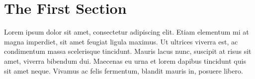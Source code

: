 \documentclass[onecolumn, draftclsnofoot,10pt, compsoc]{IEEEtran}
\begin{document}
\section{The First Section}
Lorem ipsum dolor sit amet, consectetur adipiscing elit.
Etiam elementum mi at magna imperdiet, sit amet feugiat ligula maximus.
Ut ultrices viverra est, ac condimentum massa scelerisque tincidunt.
Mauris lacus nunc, suscipit at risus sit amet, viverra bibendum dui.
Maecenas eu urna et lorem dapibus tincidunt quis sit amet neque.
Vivamus ac felis fermentum, blandit mauris in, posuere libero.

\nocite{cash14}


{}
\end{document}
